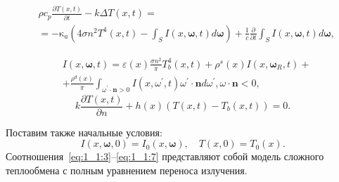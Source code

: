 \begin{equation}
    \label{eq:1_1:4}
    \begin{aligned}
        & \rho c_{p} \frac{\partial T(x, t)}{\partial t}
        -k \Delta T(x, t) = \\
        & =-\mathrm{\kappa}_{a}\left(4 \sigma n^{2} T^{4}(x, t)-
        \int_{S} I(x, \boldsymbol{\omega}, t) d \boldsymbol{\omega}\right)
        +\frac{1}{c} \frac{\partial}{\partial t}
        \int_{S} I(x, \boldsymbol{\omega}, t) d \boldsymbol{\omega},
    \end{aligned}
\end{equation}

\begin{equation}
    \label{eq:1_1:5}
    \begin{aligned}
        &I(x, \boldsymbol{\omega}, t)=\varepsilon(x)
        \frac{\sigma n^{2}}{\pi} T_{b}^{4}(x, t)+\rho^{s}(x) I
        \left(x, \boldsymbol{\omega}_{R}, t\right)+ \\
        & +\frac{\rho^{d}(x)}{\pi} \int_{\omega^{\prime}
        \cdot \mathbf{n}>0} I\left(x, \omega^{\prime}, t\right) \omega^{\prime}
        \cdot \mathbf{n} d \omega^{\prime}, \omega \cdot \mathbf{n}<0,
    \end{aligned}
\end{equation}
\begin{equation}
    \label{eq:1_1:6}
        k \frac{\partial T(x, t)}{\partial n} + h(x)\left(T(x, t)-T_{b}(x, t)\right) = 0.
\end{equation}

Поставим также начальные условия:
\begin{equation}
    \label{eq:1_1:7}
    I(x, \boldsymbol{\omega}, 0)=I_{0}(x, \boldsymbol{\omega}), \quad T(x, 0)=T_{0}(x).
\end{equation}
Соотношения~\eqref{eq:1_1:3}--\eqref{eq:1_1:7} представляют
собой модель сложного
теплообмена с полным уравнением переноса излучения.


